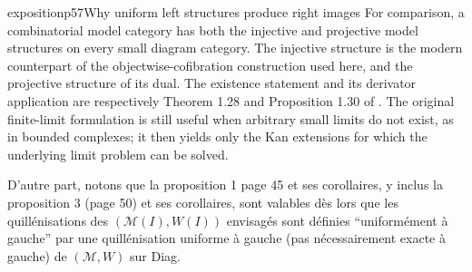 \begin{dcomment}{exposition}{p57}{Why uniform left structures produce right images}
For comparison, a combinatorial model category has both the injective and projective model structures on every small diagram category. The injective structure is the modern counterpart of the objectwise-cofibration construction used here, and the projective structure of its dual. The existence statement and its derivator application are respectively Theorem 1.28 and Proposition 1.30 of \citet{Groth2013}. The original finite-limit formulation is still useful when arbitrary small limits do not exist, as in bounded complexes; it then yields only the Kan extensions for which the underlying limit problem can be solved.
\end{dcomment}


D'autre part, notons que la proposition 1 page 45 et ses corollaires, y inclus la proposition 3 (page 50) et ses corollaires, sont valables dès lors que les quillénisations des $(\mathcal{M}(I),W(I))$ envisagés sont définies ``uniformément à gauche'' par une quillénisation uniforme à gauche (pas nécessairement exacte à gauche) de $(\mathcal{M},W)$ sur Diag.


